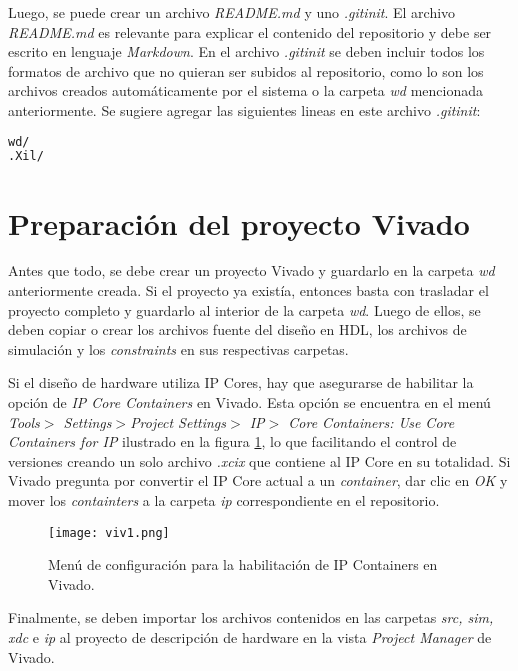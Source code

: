 	Luego, se puede crear un archivo \textit{README.md} y uno \textit{.gitinit}. El archivo \textit{README.md} es relevante para explicar el contenido del repositorio y debe ser escrito en lenguaje \textit{Markdown}. En el archivo \textit{.gitinit} se deben incluir todos los formatos de archivo que no quieran ser subidos al repositorio, como lo son los archivos creados automáticamente por el sistema o la carpeta \textit{wd} mencionada anteriormente. Se sugiere agregar las siguientes lineas en este archivo \textit{.gitinit}:

\begin{lstlisting}[language=bash, frame=single]
wd/
.Xil/
\end{lstlisting}

\section{Preparación del proyecto Vivado}
	Antes que todo, se debe crear un proyecto Vivado y guardarlo en la carpeta \textit{wd} anteriormente creada. Si el proyecto ya existía, entonces basta con trasladar el proyecto completo y guardarlo al interior de la carpeta \textit{wd}. Luego de ellos, se deben copiar o crear los archivos fuente del diseño en HDL, los archivos de simulación y los \textit{constraints} en sus respectivas carpetas.
	
	Si el diseño de hardware utiliza IP Cores, hay que asegurarse de habilitar la opción de \textit{IP Core Containers} en Vivado. Esta opción se encuentra en el menú \textit{Tools$>$ Settings$> $Project Settings$>$ IP$>$ Core Containers: Use Core Containers for IP} ilustrado en la figura \ref{fig:viv1}, lo que facilitando el control de versiones creando un solo archivo \textit{.xcix} que contiene al IP Core en su totalidad. Si Vivado pregunta por convertir el IP Core actual a un \textit{container}, dar clic en \textit{OK} y mover los \textit{containters} a la carpeta \textit{ip} correspondiente en el repositorio.
	
	\begin{figure}[ht]
		\centering
		\texttt{[image: viv1.png]}
		\caption{Menú de configuración para la habilitación de IP Containers en Vivado.}
		\label{fig:viv1}
	\end{figure}
	
	Finalmente, se deben importar los archivos contenidos en las carpetas \textit{src, sim, xdc} e \textit{ip} al proyecto de descripción de hardware en la vista \textit{Project Manager} de Vivado.

